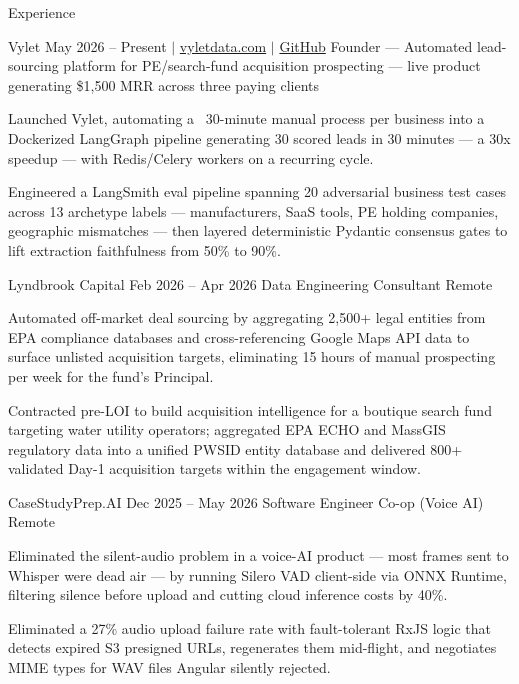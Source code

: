 \documentclass[
	11pt
]{../../../template}
\begin{document}
	\begin{rSection}{E}{xperience}
		\begin{rSectionEntry}
			{Vylet}
			{May 2026 -- Present $\vert$ \href{https://vyletdata.com}{vyletdata.com} $\vert$ \href{https://github.com/Verdent06/Lead-Gen-Agentic-Pipeline}{GitHub}}
			{Founder --- Automated lead-sourcing platform for PE/search-fund acquisition prospecting --- live product generating \$1,500 MRR across three paying clients}
			{}
			{}

			\item Launched Vylet, automating a ~30-minute manual process per business into a Dockerized LangGraph pipeline generating 30 scored leads in 30 minutes --- a 30x speedup --- with Redis/Celery workers on a recurring cycle.
			\item Engineered a LangSmith eval pipeline spanning 20 adversarial business test cases across 13 archetype labels --- manufacturers, SaaS tools, PE holding companies, geographic mismatches --- then layered deterministic Pydantic consensus gates to lift extraction faithfulness from 50\% to 90\%.
		\end{rSectionEntry}

		\begin{rSectionEntry}
			{Lyndbrook Capital}
			{Feb 2026 -- Apr 2026}
			{Data Engineering Consultant}
			{}
			{Remote}

			\item Automated off-market deal sourcing by aggregating 2,500+ legal entities from EPA compliance databases and cross-referencing Google Maps API data to surface unlisted acquisition targets, eliminating 15 hours of manual prospecting per week for the fund's Principal.
			\item Contracted pre-LOI to build acquisition intelligence for a boutique search fund targeting water utility operators; aggregated EPA ECHO and MassGIS regulatory data into a unified PWSID entity database and delivered 800+ validated Day-1 acquisition targets within the engagement window.
		\end{rSectionEntry}

		\begin{rSectionEntry}
			{CaseStudyPrep.AI}
			{Dec 2025 -- May 2026}
			{Software Engineer Co-op (Voice AI)}
			{}
			{Remote}

			\item Eliminated the silent-audio problem in a voice-AI product --- most frames sent to Whisper were dead air --- by running Silero VAD client-side via ONNX Runtime, filtering silence before upload and cutting cloud inference costs by 40\%.
			\item Eliminated a 27\% audio upload failure rate with fault-tolerant RxJS logic that detects expired S3 presigned URLs, regenerates them mid-flight, and negotiates MIME types for WAV files Angular silently rejected.
		\end{rSectionEntry}


\end{rSection}
\end{document}
